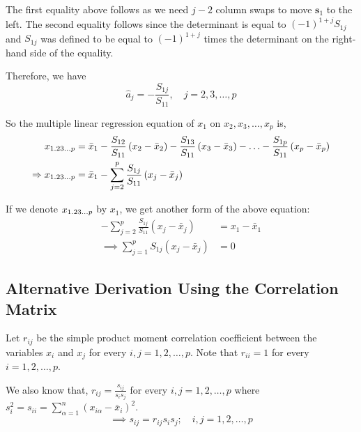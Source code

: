 \documentclass[10pt]{article}
\begin{document}
The first equality above follows as we need $ j-2 $ column swaps to move $ \mathbf{s}_1 $ to the left. 
The second equality follows since the determinant is equal to $ (-1)^{1+j} S_{1j} $ and $S_{1j} $ was defined to be equal to $(-1)^{1+j}$ times the determinant on the right-hand side of the equality.

Therefore, we have 
\begin{equation}
	\hat{a}_j = -\frac{ S_{1j} }{ S_{11}}, \quad j = 2, 3, \ldots, p
\end{equation}

So the multiple linear regression equation of $ x_1 $ on $ x_2, x_3, \ldots, x_p $ is,
\begin{align}
	x_{1.23\dots p} &= \bar{x}_1 - \frac{ S_{12} }{ S_{11} } \left( x_2 - \bar{x}_2 \right) - \frac{ S_{13} }{ S_{11} } \left( x_3 - \bar{x}_3 \right) - \ldots - \frac{ S_{1p} }{ S_{11} } \left( x_p - \bar{x}_p \right) \nonumber \\
	\Rightarrow x_{1.23\dots p} &= \bar{x}_1 - \sum_{j=2}^{p} \frac{ S_{1j} }{ S_{11} } \left( x_j - \bar{x}_j \right) 
\end{align}

If we denote $ x_{1.23\dots p} $ by $ x_1 $, we get another form of the above equation:
\begin{align}
	- \sum_{j=2}^{p} \frac{ S_{1j} }{ S_{11} } \left( x_j - \bar{x}_j \right) &= x_1 - \bar{x}_1 \nonumber \\
	\implies  \sum_{j=1}^{p} { S_{1j} } \left( x_j - \bar{x}_j \right) &= 0
\end{align}

\subsection{Alternative Derivation Using the Correlation Matrix}

Let $ r_{ij} $ be the simple product moment correlation coefficient between the variables $ x_i $ and $ x_j $ for every \mbox{$ i, j = 1, 2, \ldots, p $}. 
Note that $ r_{ii} = 1 $ for every $ i = 1, 2, \ldots, p $.

We also know that, $ r_{ij} = \frac{ s_{ij} }{ s_is_j } $ for every $ i, j = 1, 2, \ldots, p $ where $ s_{i}^{2} = s_{ii} = \sum_{\alpha = 1}^{n} \left( x_{i\alpha} - \bar{x}_i \right) ^{2} $.
\begin{equation}
	\implies s_{ij} = r_{ij}s_is_j ; \quad i, j = 1, 2, \dots, p  \label{cov-cor_eq}
\end{equation}
\end{document}
